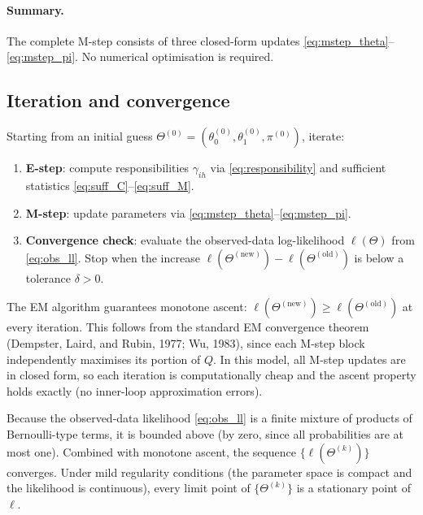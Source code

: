 \documentclass[12pt]{article}
\begin{document}
\paragraph{Summary.} The complete M-step consists of three closed-form
updates \eqref{eq:mstep_theta}--\eqref{eq:mstep_pi}. No numerical
optimisation is required.

\subsection{Iteration and convergence}
\label{sec:convergence}

Starting from an initial guess \(\Theta^{(0)} = (\theta_0^{(0)},
\theta_1^{(0)}, \pi^{(0)})\), iterate:
\begin{enumerate}
\item \textbf{E-step}: compute responsibilities \(\gamma_{ih}\) via
  \eqref{eq:responsibility} and sufficient statistics
  \eqref{eq:suff_C}--\eqref{eq:suff_M}.
\item \textbf{M-step}: update parameters via
  \eqref{eq:mstep_theta}--\eqref{eq:mstep_pi}.
\item \textbf{Convergence check}: evaluate the observed-data
  log-likelihood \(\ell(\Theta)\) from \eqref{eq:obs_ll}. Stop when the
  increase \(\ell(\Theta^{(\text{new})}) - \ell(\Theta^{(\text{old})})\)
  is below a tolerance \(\delta > 0\).
\end{enumerate}
The EM algorithm guarantees monotone ascent:
\(\ell(\Theta^{(\text{new})}) \geq \ell(\Theta^{(\text{old})})\) at
every iteration. This follows from the standard EM convergence theorem
(Dempster, Laird, and Rubin, 1977; Wu, 1983), since each M-step block
independently maximises its portion of \(Q\). In this model, all M-step
updates are in closed form, so each iteration is computationally cheap
and the ascent property holds exactly (no inner-loop approximation
errors).

Because the observed-data likelihood \eqref{eq:obs_ll} is a finite
mixture of products of Bernoulli-type terms, it is bounded above
(by zero, since all probabilities are at most one). Combined with
monotone ascent, the sequence \(\{\ell(\Theta^{(k)})\}\) converges.
Under mild regularity conditions (the parameter space is compact and the
likelihood is continuous), every limit point of
\(\{\Theta^{(k)}\}\) is a stationary point of \(\ell\).
\end{document}
